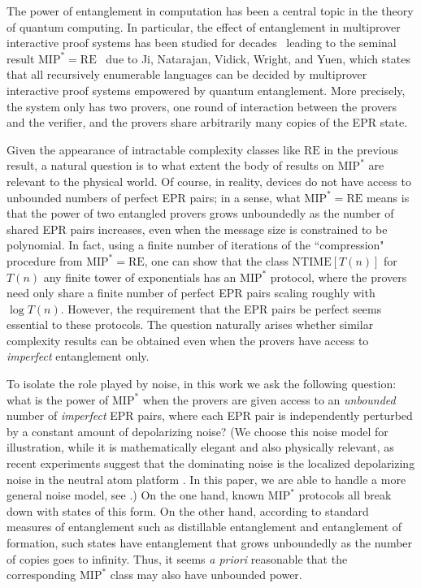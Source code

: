\documentclass[11pt]{article}
\theoremstyle{plain}
\theoremstyle{definition}
\newcommand{\1}{\mathbb{1}} %
\newcommand{\MIP}{\mathrm{MIP}}
\newcommand{\RE}{\mathrm{RE}}
\begin{document}
The power of entanglement in computation has been a central topic in the theory of quantum computing. In particular, the effect of entanglement in multiprover interactive proof systems has been studied for decades~\cite{doi:10.1137/090772885,doi:10.1137/090751293,Ito:2009:OTO:1602931.1603187,Ji:2017:CQM:3055399.3055441,Slo:2020,slofstra:2019}  leading to the seminal result $\mathrm{MIP}^*=\mathrm{RE}$~\cite{JNVWYuen'20,JNVWY'20} due to Ji, Natarajan, Vidick, Wright, and Yuen, which states that all recursively enumerable languages can be decided by multiprover interactive proof systems empowered by quantum entanglement. More precisely, the system only has two provers, one round of interaction between the provers and the verifier, and the provers share arbitrarily many copies of the EPR state.



Given the appearance of intractable complexity classes like $\RE$ in the previous result, a natural question is to what extent the body of results on $\MIP^*$ are relevant to the physical world. Of course, in reality, devices do not have access to unbounded numbers of perfect EPR pairs; in a sense, what $\MIP^* = \RE$ means is that the power of two entangled provers grows unboundedly as the number of shared EPR pairs increases, even when the message size is constrained to be polynomial. In fact, using a finite number of iterations of the ``compression" procedure from $\MIP^* = \RE$, one can show that the class $\mathrm{NTIME}[T(n)]$ for $T(n)$ any finite tower of exponentials has an $\MIP^*$ protocol, where the provers need only share a finite number of perfect EPR pairs scaling roughly with $\log T(n)$. However, the requirement that the EPR pairs be perfect seems essential to these protocols. The question naturally arises whether similar complexity results can be obtained even when the provers have access to \emph{imperfect} entanglement only.



To isolate the role played by noise, in this work we ask the following question: what is the power of $\MIP^*$ when the provers are given access to an \emph{unbounded} number of \emph{imperfect} EPR pairs, where each EPR pair is independently perturbed by a constant amount of depolarizing noise? (We choose this noise model for illustration, while it is mathematically elegant and also physically relevant, as recent experiments suggest that the dominating noise is the localized depolarizing noise in the neutral atom platform \cite{bluvstein2023logical}. In this paper, we are able to handle a more general noise model, see .) On the one hand, known $\MIP^*$ protocols all break down with states of this form. On the other hand, according to standard measures of entanglement such as distillable entanglement and entanglement of formation, such states have entanglement that grows unboundedly as the number of copies goes to infinity. Thus, it seems \emph{a priori} reasonable that the corresponding $\MIP^*$ class may also have unbounded power.
\end{document}
